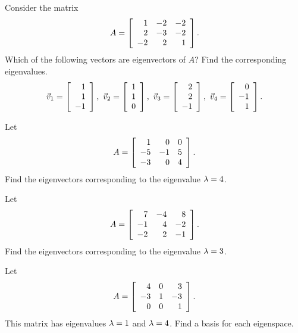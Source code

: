 \documentclass{ximera}
\author{Zack Reed}
\begin{document}
\begin{exercise}
  Consider the matrix
  \begin{equation*}
    A = \startmat{rrr}
      1 & -2 & -2 \\
      2 & -3 & -2 \\
      -2 & 2 &  1 \\
    \stopmat.
  \end{equation*}
  Which of the following vectors are eigenvectors of $A$? Find the
  corresponding eigenvalues.
  \begin{equation*}
    \vect{v}_1 = \startmat{r} 1 \\ 1 \\ -1 \stopmat,\quad
    \vect{v}_2 = \startmat{r} 1 \\ 1 \\ 0 \stopmat,\quad
    \vect{v}_3 = \startmat{r} 2 \\ 2 \\ -1 \stopmat,\quad
    \vect{v}_4 = \startmat{r} 0 \\ -1 \\ 1 \stopmat.
  \end{equation*}
\end{exercise}

\begin{exercise}
  Let
  \begin{equation*}
    A = \startmat{rrr}
      1  &  0 & 0 \\
      -5 & -1 & 5 \\
      -3 &  0 & 4 \\
    \stopmat.
  \end{equation*}
  Find the eigenvectors corresponding to the eigenvalue $\eigenvar=4$.
\end{exercise}

\begin{exercise}
  Let
  \begin{equation*}
    A = \startmat{rrr}
      7 &  -4 &   8 \\
      -1 &  4 &  -2 \\
      -2 &  2 &  -1 \\
    \stopmat.
  \end{equation*}
  Find the eigenvectors corresponding to the eigenvalue $\eigenvar=3$.
\end{exercise}

\begin{exercise}
  Let
  \begin{equation*}
    A = \startmat{rrr}
      4 &   0 &   3 \\
      -3 &   1 &  -3 \\
      0 &   0 &   1 \\
    \stopmat.
  \end{equation*}
  This matrix has eigenvalues $\eigenvar=1$ and $\eigenvar=4$. Find a
  basis for each eigenspace.
\end{exercise}
\end{document}
